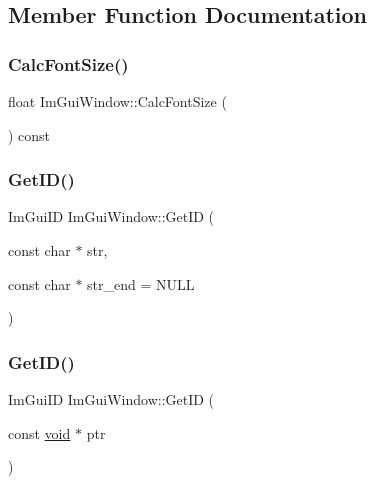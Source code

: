 \subsection{Member Function Documentation}
\mbox{\label{structImGuiWindow_a6881ed65e208fb6e015d3ae6bccfc794}} 
\subsubsection{\texorpdfstring{Calc\+Font\+Size()}{CalcFontSize()}}
{\footnotesize\ttfamily float Im\+Gui\+Window\+::\+Calc\+Font\+Size (\begin{DoxyParamCaption}{ }\end{DoxyParamCaption}) const\hspace{0.3cm}{\ttfamily [inline]}}

\mbox{\label{structImGuiWindow_a66400a63bc0b54d7d29e08d1b1b1a42b}} 
\subsubsection{\texorpdfstring{Get\+I\+D()}{GetID()}\hspace{0.1cm}{\footnotesize\ttfamily [1/3]}}
{\footnotesize\ttfamily Im\+Gui\+ID Im\+Gui\+Window\+::\+Get\+ID (\begin{DoxyParamCaption}\item[{const char $\ast$}]{str,  }\item[{const char $\ast$}]{str\+\_\+end = {\ttfamily NULL} }\end{DoxyParamCaption})}

\mbox{\label{structImGuiWindow_aae21dffb343cabca9414499b827912a8}} 
\subsubsection{\texorpdfstring{Get\+I\+D()}{GetID()}\hspace{0.1cm}{\footnotesize\ttfamily [2/3]}}
{\footnotesize\ttfamily Im\+Gui\+ID Im\+Gui\+Window\+::\+Get\+ID (\begin{DoxyParamCaption}\item[{const \hyperlink{imgui__impl__opengl3__loader_8h_ac668e7cffd9e2e9cfee428b9b2f34fa7}{void} $\ast$}]{ptr }\end{DoxyParamCaption})}


